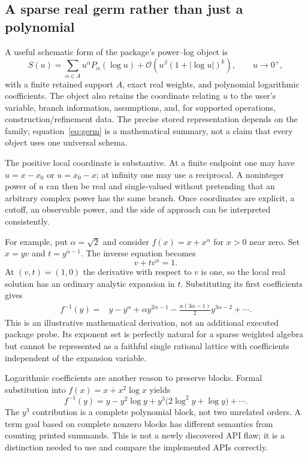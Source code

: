 \documentclass[11pt,letterpaper]{article}
\newcommand{\code}[1]{\texttt{\detokenize{#1}}}
\newcommand{\OO}{\mathcal{O}}
\begin{document}
\subsection{A sparse real germ rather than just a polynomial}
A useful schematic form of the package's power--log object is
\begin{equation}
 S(u)=\sum_{\alpha\in A}u^\alpha P_\alpha(\log u)
       +\OO\!\left(u^\beta(1+|\log u|)^k\right),\qquad u\to0^+,
 \label{eq:germ}
\end{equation}
with a finite retained support $A$, exact real weights, and polynomial logarithmic coefficients. The object also retains the coordinate relating $u$ to the user's variable, branch information, assumptions, and, for supported operations, construction/refinement data. The precise stored representation depends on the family; equation~\eqref{eq:germ} is a mathematical summary, not a claim that every object uses one universal schema.\cite{readme,kernel,native}

The positive local coordinate is substantive. At a finite endpoint one may have $u=x-x_0$ or $u=x_0-x$; at infinity one may use a reciprocal. A noninteger power of $u$ can then be real and single-valued without pretending that an arbitrary complex power has the same branch. Once coordinates are explicit, a cutoff, an observable power, and the side of approach can be interpreted consistently.

For example, put $\alpha=\sqrt2$ and consider $f(x)=x+x^\alpha$ for $x>0$ near zero. Set $x=yv$ and $t=y^{\alpha-1}$. The inverse equation becomes
\[
 v+t v^\alpha=1.
\]
At $(v,t)=(1,0)$ the derivative with respect to $v$ is one, so the local real solution has an ordinary analytic expansion in $t$. Substituting its first coefficients gives
\begin{align*}
 f^{-1}(y)={}&y-y^\alpha+\alpha y^{2\alpha-1}
 -\frac{\alpha(3\alpha-1)}2y^{3\alpha-2}+\cdots.
\end{align*}
This is an illustrative mathematical derivation, not an additional executed package probe. Its exponent set is perfectly natural for a sparse weighted algebra but cannot be represented as a faithful single rational \code{SeriesData} lattice with coefficients independent of the expansion variable.

Logarithmic coefficients are another reason to preserve blocks. Formal substitution into $f(x)=x+x^2\log x$ yields
\[
 f^{-1}(y)=y-y^2\log y+y^3\bigl(2\log^2 y+\log y\bigr)+\cdots.
\]
The $y^3$ contribution is a complete polynomial block, not two unrelated orders. A term goal based on complete nonzero blocks has different semantics from counting printed summands. This is not a newly discovered API flaw; it is a distinction needed to use and compare the implemented APIs correctly.\cite{readme,register}
\end{document}
